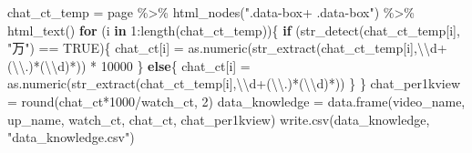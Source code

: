 \documentclass[
]{article}
\newenvironment{Shaded}{\begin{snugshade}}{\end{snugshade}}
\newcommand{\ConstantTok}[1]{\textcolor[rgb]{0.00,0.00,0.00}{#1}}
\newcommand{\ControlFlowTok}[1]{\textcolor[rgb]{0.13,0.29,0.53}{\textbf{#1}}}
\newcommand{\DecValTok}[1]{\textcolor[rgb]{0.00,0.00,0.81}{#1}}
\newcommand{\FunctionTok}[1]{\textcolor[rgb]{0.00,0.00,0.00}{#1}}
\newcommand{\NormalTok}[1]{#1}
\newcommand{\OtherTok}[1]{\textcolor[rgb]{0.56,0.35,0.01}{#1}}
\newcommand{\SpecialCharTok}[1]{\textcolor[rgb]{0.00,0.00,0.00}{#1}}
\newcommand{\StringTok}[1]{\textcolor[rgb]{0.31,0.60,0.02}{#1}}
\begin{document}
\begin{Shaded}
\begin{Highlighting}[]
\NormalTok{chat\_ct\_temp }\OtherTok{=}\NormalTok{ page }\SpecialCharTok{\%\textgreater{}\%} \FunctionTok{html\_nodes}\NormalTok{(}\StringTok{".data{-}box+ .data{-}box"}\NormalTok{) }\SpecialCharTok{\%\textgreater{}\%} \FunctionTok{html\_text}\NormalTok{()}
\ControlFlowTok{for}\NormalTok{ (i }\ControlFlowTok{in} \DecValTok{1}\SpecialCharTok{:}\FunctionTok{length}\NormalTok{(chat\_ct\_temp))\{}
  \ControlFlowTok{if}\NormalTok{ (}\FunctionTok{str\_detect}\NormalTok{(chat\_ct\_temp[i], }\StringTok{"万"}\NormalTok{) }\SpecialCharTok{==} \ConstantTok{TRUE}\NormalTok{)\{}
\NormalTok{    chat\_ct[i] }\OtherTok{=} \FunctionTok{as.numeric}\NormalTok{(}\FunctionTok{str\_extract}\NormalTok{(chat\_ct\_temp[i],}\StringTok{\textquotesingle{}}\SpecialCharTok{\textbackslash{}\textbackslash{}}\StringTok{d+(}\SpecialCharTok{\textbackslash{}\textbackslash{}}\StringTok{.)*(}\SpecialCharTok{\textbackslash{}\textbackslash{}}\StringTok{d)*\textquotesingle{}}\NormalTok{)) }\SpecialCharTok{*} \DecValTok{10000}
\NormalTok{  \}}
  \ControlFlowTok{else}\NormalTok{\{}
\NormalTok{    chat\_ct[i] }\OtherTok{=} \FunctionTok{as.numeric}\NormalTok{(}\FunctionTok{str\_extract}\NormalTok{(chat\_ct\_temp[i],}\StringTok{\textquotesingle{}}\SpecialCharTok{\textbackslash{}\textbackslash{}}\StringTok{d+(}\SpecialCharTok{\textbackslash{}\textbackslash{}}\StringTok{.)*(}\SpecialCharTok{\textbackslash{}\textbackslash{}}\StringTok{d)*\textquotesingle{}}\NormalTok{))}
\NormalTok{  \}}
\NormalTok{\}}
\NormalTok{chat\_per1kview }\OtherTok{=} \FunctionTok{round}\NormalTok{(chat\_ct}\SpecialCharTok{*}\DecValTok{1000}\SpecialCharTok{/}\NormalTok{watch\_ct, }\DecValTok{2}\NormalTok{)}
\NormalTok{data\_knowledge }\OtherTok{=} \FunctionTok{data.frame}\NormalTok{(video\_name, up\_name, watch\_ct, chat\_ct, chat\_per1kview)}
\FunctionTok{write.csv}\NormalTok{(data\_knowledge, }\StringTok{"data\_knowledge.csv"}\NormalTok{)}
\end{Highlighting}
\end{Shaded}
\end{document}
